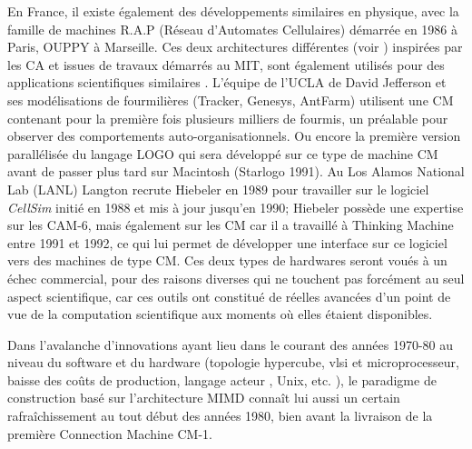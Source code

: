 En France, il existe également des développements similaires en physique, avec la famille de machines R.A.P (Réseau d’Automates Cellulaires) démarrée en 1986 à Paris, OUPPY à Marseille. Ces deux architectures différentes (voir \autocite{Hillis1981}) inspirées par les CA \autocites{Hillis1984, Hillis1989, Toffoli1987} et  issues de travaux démarrés au MIT, sont également utilisés pour des applications scientifiques similaires \autocites{Epez1993, Toffoli2005}. L’équipe de l’UCLA de David Jefferson et ses modélisations de fourmilières (Tracker, Genesys, AntFarm) utilisent une CM contenant pour la première fois plusieurs milliers de fourmis, un préalable pour observer des comportements auto-organisationnels. Ou encore la première version parallélisée du langage LOGO qui sera développé sur ce type de machine CM avant de passer plus tard sur Macintosh (Starlogo 1991). Au Los Alamos National Lab (LANL) Langton recrute Hiebeler en 1989 pour travailler sur le logiciel \textit{CellSim} initié en 1988 et mis à jour jusqu’en 1990; Hiebeler possède une expertise sur les CAM-6, mais également sur les CM car il a travaillé à Thinking Machine entre 1991 et 1992, ce qui lui permet de développer une interface sur ce logiciel vers des machines de type CM. Ces deux types de hardwares seront voués à un échec commercial, pour des raisons diverses qui ne touchent pas forcément au seul aspect scientifique, car ces outils ont constitué de réelles avancées d’un point de vue de la computation scientifique aux moments où elles étaient disponibles.

Dans l'avalanche d'innovations ayant lieu dans le courant des années 1970-80 au niveau du software et du hardware (topologie hypercube, vlsi et microprocesseur, baisse des coûts de production, langage acteur \autocite{Hewitt1973}, Unix, etc. ), le paradigme de construction basé sur l'architecture MIMD  connaît lui aussi un certain rafraîchissement au tout début des années 1980, bien avant la livraison de la première Connection Machine CM-1.

